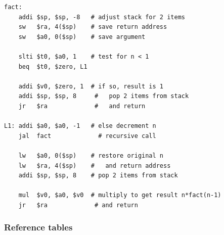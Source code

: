 \begin{eg}
\leavevmode
\begin{lstlisting}
fact:
    addi $sp, $sp, -8   # adjust stack for 2 items
    sw   $ra, 4($sp)    # save return address
    sw   $a0, 0($sp)    # save argument

    slti $t0, $a0, 1    # test for n < 1
    beq  $t0, $zero, L1

    addi $v0, $zero, 1  # if so, result is 1
    addi $sp, $sp, 8     #   pop 2 items from stack
    jr   $ra             #   and return

L1: addi $a0, $a0, -1   # else decrement n
    jal  fact             # recursive call

    lw   $a0, 0($sp)    # restore original n
    lw   $ra, 4($sp)    #   and return address
    addi $sp, $sp, 8    # pop 2 items from stack

    mul  $v0, $a0, $v0  # multiply to get result n*fact(n-1)
    jr   $ra             # and return
\end{lstlisting}
\end{eg}

\subsubsection{Reference tables}

